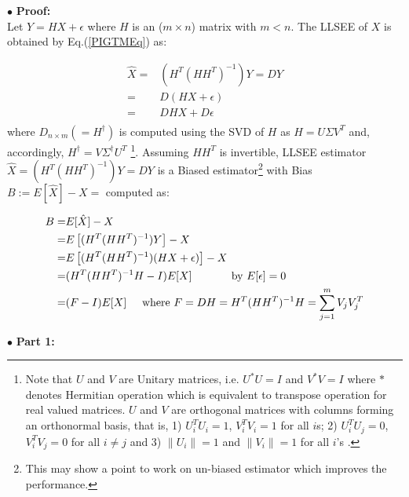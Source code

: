 $\bullet$ \textbf{Proof:}\\

Let $Y=HX+\epsilon$ where $H$ is an ($m\times n$) matrix with $m<n$. The LLSEE of $X$ is obtained by Eq.(\ref{PIGTMEq}) as: 

\begin{equation}\label{P2Eq1}
\begin{aligned}
\hat{X} = & (H^{T}(HH^{T})^{-1})Y=DY\\
        = & D(HX+\epsilon)\\
        = & DHX+D\epsilon\\
\end{aligned}
\end{equation}
where $D_{n\times m}(=H^{\dagger})$ is computed using the SVD of $H$ as $H=U\Sigma V^{T}$ and, accordingly, $H^{\dagger}=V\Sigma^{\dagger} U^{T}$ \footnote{Note that $U$ and $V$ are Unitary matrices, i.e. $U^{*}U=I$ and $V^{*}V=I$ where $*$ denotes Hermitian operation which is equivalent to transpose operation for real valued matrices. $U$ and $V$ are orthogonal matrices with columns forming an orthonormal basis, that is, 1) $U^{T}_{i}U_{i}=1$, $V^{T}_{i}V_{i}=1$ for all $i$s; 2) $U^{T}_{i}U_{j}=0$, $V^{T}_{i}V_{j}=0$ for all $i\neq j$ and 3) $\left\|U_{i}\right\|=1$ and $\left\|V_{i}\right\|=1$ for all $i$'s \cite{Strang, Golub}.}. Assuming $HH^{T}$ is invertible, LLSEE estimator $\hat{X} = (H^{T}(HH^{T})^{-1})Y=DY$ is a Biased estimator\footnote{This may show a point to work on un-biased estimator which improves the performance.} with Bias $B:=E[\hat{X}]-X=$ computed as:

\begin{equation}\label{P2Eq2}
\begin{aligned}
B = & E[\hat{X}]-X \\
  = & E\left[ (H^{T}(HH^{T})^{-1})Y \right] - X\\
  = & E\left[ (H^{T}(HH^{T})^{-1})(HX+\epsilon) \right] - X  \\
  = & (H^{T}(HH^{T})^{-1}H-I)E[X] \hspace{0.5in} \text{by $E[\epsilon]=0$}\\
  = & (F-I)E[X] \hspace{0.5cm} \text{where $F=DH=H^{T}(HH^{T})^{-1}H=\sum_{j=1}^{m} V_{j}V_{j}^{T}$} \\  
\end{aligned}
\end{equation}

$\bullet$ \textbf{Part 1:} \\

